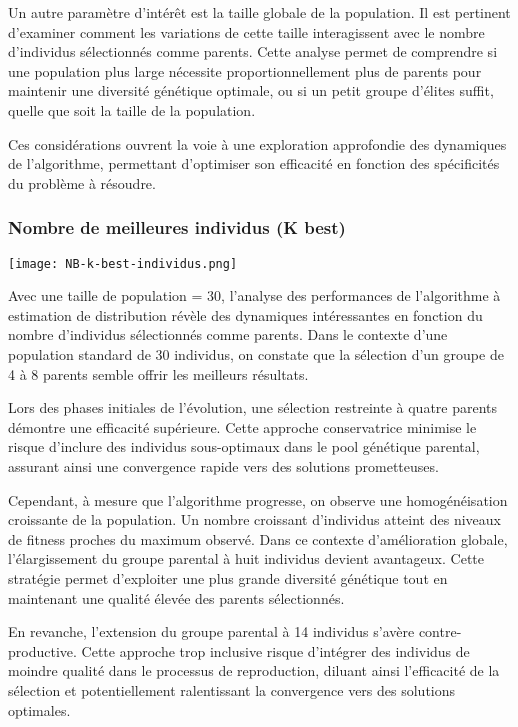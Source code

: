 \documentclass{article}
\begin{document}
Un autre paramètre d'intérêt est la taille globale de la population. Il est pertinent d'examiner comment les variations de cette taille interagissent avec le nombre d'individus sélectionnés comme parents. Cette analyse permet de comprendre si une population plus large nécessite proportionnellement plus de parents pour maintenir une diversité génétique optimale, ou si un petit groupe d'élites suffit, quelle que soit la taille de la population.

Ces considérations ouvrent la voie à une exploration approfondie des dynamiques de l'algorithme, permettant d'optimiser son efficacité en fonction des spécificités du problème à résoudre.

\subsubsection{Nombre de meilleures individus (K best)}
\texttt{[image: NB-k-best-individus.png]}

Avec une taille de population = 30, l'analyse des performances de l'algorithme à estimation de distribution révèle des dynamiques intéressantes en fonction du nombre d'individus sélectionnés comme parents. Dans le contexte d'une population standard de 30 individus, on constate que la sélection d'un groupe de 4 à 8 parents semble offrir les meilleurs résultats.

Lors des phases initiales de l'évolution, une sélection restreinte à quatre parents démontre une efficacité supérieure. Cette approche conservatrice minimise le risque d'inclure des individus sous-optimaux dans le pool génétique parental, assurant ainsi une convergence rapide vers des solutions prometteuses.

Cependant, à mesure que l'algorithme progresse, on observe une homogénéisation croissante de la population. Un nombre croissant d'individus atteint des niveaux de fitness proches du maximum observé. Dans ce contexte d'amélioration globale, l'élargissement du groupe parental à huit individus devient avantageux. Cette stratégie permet d'exploiter une plus grande diversité génétique tout en maintenant une qualité élevée des parents sélectionnés.


En revanche, l'extension du groupe parental à 14 individus s'avère contre-productive. Cette approche trop inclusive risque d'intégrer des individus de moindre qualité dans le processus de reproduction, diluant ainsi l'efficacité de la sélection et potentiellement ralentissant la convergence vers des solutions optimales.
\end{document}
